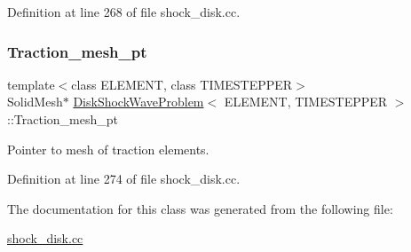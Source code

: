 Definition at line 268 of file shock\+\_\+disk.\+cc.

\mbox{\label{classDiskShockWaveProblem_a286fe7d51aa16f07f0444ae7c553f140}} 
\subsubsection{\texorpdfstring{Traction\+\_\+mesh\+\_\+pt}{Traction\_mesh\_pt}}
{\footnotesize\ttfamily template$<$class E\+L\+E\+M\+E\+NT, class T\+I\+M\+E\+S\+T\+E\+P\+P\+ER$>$ \\
Solid\+Mesh$\ast$ \hyperlink{classDiskShockWaveProblem}{Disk\+Shock\+Wave\+Problem}$<$ E\+L\+E\+M\+E\+NT, T\+I\+M\+E\+S\+T\+E\+P\+P\+ER $>$\+::Traction\+\_\+mesh\+\_\+pt\hspace{0.3cm}{\ttfamily [private]}}



Pointer to mesh of traction elements. 



Definition at line 274 of file shock\+\_\+disk.\+cc.



The documentation for this class was generated from the following file\+:\begin{DoxyCompactItemize}
\item 
\hyperlink{shock__disk_8cc}{shock\+\_\+disk.\+cc}\end{DoxyCompactItemize}
